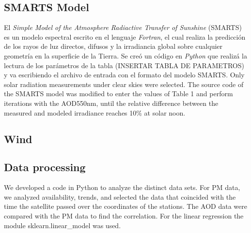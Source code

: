 \subsection{SMARTS Model}
El \textit{Simple Model of the Atmosphere Radiactive Transfer of Sunshine} (SMARTS) es un modelo espectral
escrito en el lenguaje \textit{Fortran}, el cual realiza la predicción de los rayos de luz directos, difusos y la 
irradiancia global sobre cualquier geometría en la superficie de la Tierra. Se creó un código en \textit{Python} que 
realizá la lectura de los parámetros de la tabla (INSERTAR TABLA DE PARAMETROS) y va escribiendo el archivo de entrada 
con el formato del modelo SMARTS. 
Only solar radiation measurements under clear skies were selected. The source code of the SMARTS model was
modified to enter the values of Table 1 and perform iterations with the AOD550nm, until the relative difference
between the measured and modeled irradiance reaches 10\% at solar noon.

\subsection{Wind}
\subsection{Data processing}
We developed a code in Python to analyze the distinct data sets. For PM data, we analyzed availability,
trends, and selected the data that coincided with the time the satellite passed over the coordinates of
the stations. The AOD data were compared with the PM data to find the correlation. For the linear regression
the module sklearn.linear\_model was used.